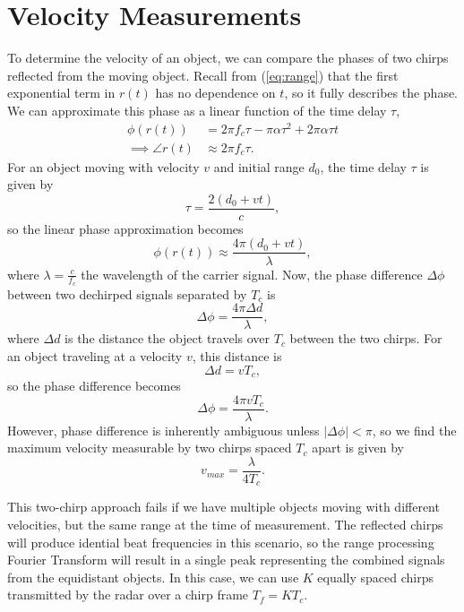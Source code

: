 \section{Velocity Measurements}
To determine the velocity of an object, we can compare the phases of two chirps
reflected from the moving object. Recall from (\ref{eq:range}) that the first
exponential term in $r(t)$ has no dependence on $t$, so it fully describes the phase. We
can approximate this phase as a linear function of the time delay $\tau$, 
\begin{align}
	\phi(r(t)) &= 2\pi f_c \tau - \pi \alpha \tau^2 + 2\pi\alpha\tau t \\
	\implies \angle r(t) &\approx 2\pi f_c \tau.
\end{align}
For an object moving with velocity $v$ and initial range $d_0$, the time delay
$\tau$ is given by 
\begin{equation}
	\tau = \frac{2(d_0 + vt)}{c}, \label{eq:moving-tau}
\end{equation}
so the linear phase approximation becomes
\begin{equation}
	\phi(r(t)) \approx \frac{4\pi(d_0 + vt)}{\lambda},
\end{equation}
where $\lambda = \frac{c}{f_c}$ the wavelength of
the carrier signal. Now, the phase difference $\Delta \phi$ between two
dechirped signals separated by
$T_c$ is
\begin{equation}
	\Delta\phi = \frac{4\pi \Delta d}{\lambda},
\end{equation}
where $\Delta d$ is the distance the object travels over $T_c$ between the two
chirps. For an object traveling at a velocity $v$, this distance is
\begin{equation}
	\Delta d = v T_c, 
\end{equation}
so the phase difference becomes
\begin{equation}
	\label{phase_diff}
	\Delta\phi = \frac{4\pi v T_c}{\lambda}.
\end{equation}
However, phase difference is inherently ambiguous unless $|\Delta\phi|<\pi$, so
we find the maximum velocity measurable by two chirps spaced $T_c$ apart is
given by
\begin{equation}
	v_{max} = \frac{\lambda}{4 T_c}.
\end{equation} 

This two-chirp approach fails if we have multiple objects moving with different
velocities, but the same range at the time of measurement. The reflected chirps
will produce idential beat frequencies in this scenario, so the range processing
Fourier Transform will result in a single peak representing the combined signals
from the equidistant objects. In this case, we can use $K$ equally spaced chirps 
transmitted by the radar over a chirp frame $T_f = KT_c$. 

